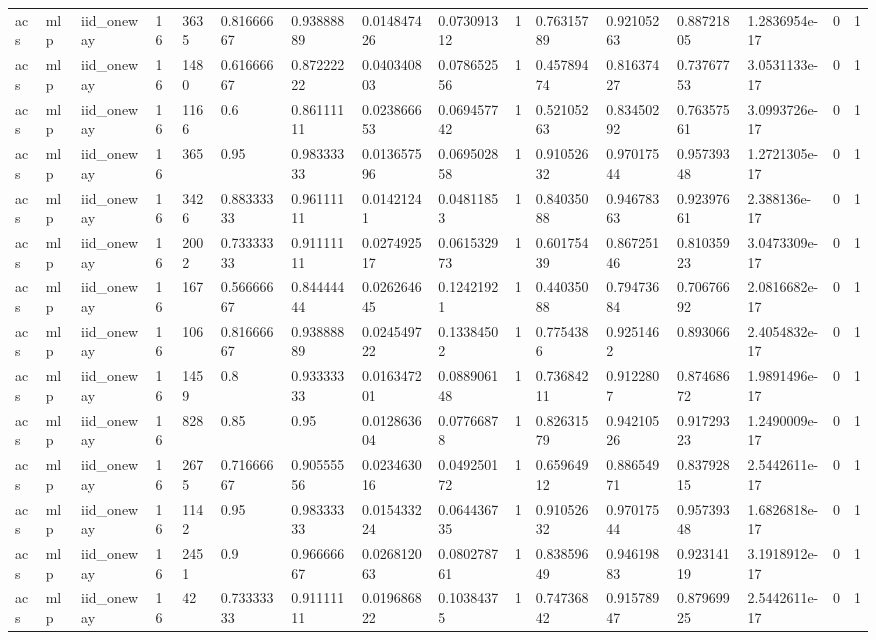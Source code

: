 \begin{tabular}{llllllllllllllll}
acs & mlp & iid\_oneway & 16 & 3635 & 0.81666667 & 0.93888889 & 0.014847426 & 0.073091312 & 1 & 0.76315789 & 0.92105263 & 0.88721805 & 1.2836954e-17 & 0 & 1 \\
acs & mlp & iid\_oneway & 16 & 1480 & 0.61666667 & 0.87222222 & 0.040340803 & 0.078652556 & 1 & 0.45789474 & 0.81637427 & 0.73767753 & 3.0531133e-17 & 0 & 1 \\
acs & mlp & iid\_oneway & 16 & 1166 & 0.6 & 0.86111111 & 0.023866653 & 0.069457742 & 1 & 0.52105263 & 0.83450292 & 0.76357561 & 3.0993726e-17 & 0 & 1 \\
acs & mlp & iid\_oneway & 16 & 365 & 0.95 & 0.98333333 & 0.013657596 & 0.069502858 & 1 & 0.91052632 & 0.97017544 & 0.95739348 & 1.2721305e-17 & 0 & 1 \\
acs & mlp & iid\_oneway & 16 & 3426 & 0.88333333 & 0.96111111 & 0.01421241 & 0.04811853 & 1 & 0.84035088 & 0.94678363 & 0.92397661 & 2.388136e-17 & 0 & 1 \\
acs & mlp & iid\_oneway & 16 & 2002 & 0.73333333 & 0.91111111 & 0.027492517 & 0.061532973 & 1 & 0.60175439 & 0.86725146 & 0.81035923 & 3.0473309e-17 & 0 & 1 \\
acs & mlp & iid\_oneway & 16 & 167 & 0.56666667 & 0.84444444 & 0.026264645 & 0.12421921 & 1 & 0.44035088 & 0.79473684 & 0.70676692 & 2.0816682e-17 & 0 & 1 \\
acs & mlp & iid\_oneway & 16 & 106 & 0.81666667 & 0.93888889 & 0.024549722 & 0.13384502 & 1 & 0.7754386 & 0.9251462 & 0.893066 & 2.4054832e-17 & 0 & 1 \\
acs & mlp & iid\_oneway & 16 & 1459 & 0.8 & 0.93333333 & 0.016347201 & 0.088906148 & 1 & 0.73684211 & 0.9122807 & 0.87468672 & 1.9891496e-17 & 0 & 1 \\
acs & mlp & iid\_oneway & 16 & 828 & 0.85 & 0.95 & 0.012863604 & 0.07766878 & 1 & 0.82631579 & 0.94210526 & 0.91729323 & 1.2490009e-17 & 0 & 1 \\
acs & mlp & iid\_oneway & 16 & 2675 & 0.71666667 & 0.90555556 & 0.023463016 & 0.049250172 & 1 & 0.65964912 & 0.88654971 & 0.83792815 & 2.5442611e-17 & 0 & 1 \\
acs & mlp & iid\_oneway & 16 & 1142 & 0.95 & 0.98333333 & 0.015433224 & 0.064436735 & 1 & 0.91052632 & 0.97017544 & 0.95739348 & 1.6826818e-17 & 0 & 1 \\
acs & mlp & iid\_oneway & 16 & 2451 & 0.9 & 0.96666667 & 0.026812063 & 0.080278761 & 1 & 0.83859649 & 0.94619883 & 0.92314119 & 3.1918912e-17 & 0 & 1 \\
acs & mlp & iid\_oneway & 16 & 42 & 0.73333333 & 0.91111111 & 0.019686822 & 0.10384375 & 1 & 0.74736842 & 0.91578947 & 0.87969925 & 2.5442611e-17 & 0 & 1 \\

\end{tabular}
